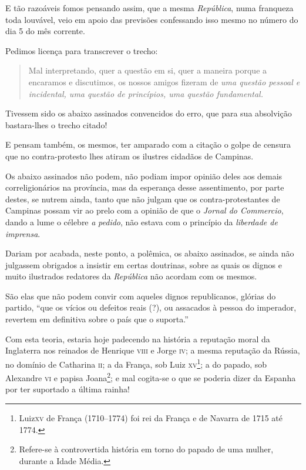 E tão razoáveis fomos pensando assim, que a mesma \emph{República}, numa
franqueza toda louvável, veio em apoio das previsões confessando isso
mesmo no número do dia 5 do mês corrente.

Pedimos licença para transcrever o trecho:

\begin{quote}
Mal interpretando, quer a questão em si, quer a maneira porque a
encaramos e discutimos, os nossos amigos fizeram de \emph{uma questão
pessoal e incidental, uma questão de princípios, uma questão
fundamental.}
\end{quote}

Tivessem sido os abaixo assinados convencidos do erro, que para sua
absolvição bastara-lhes o trecho citado!

E pensam também, os mesmos, ter amparado com a citação o golpe de
censura que no contra-protesto lhes atiram os ilustres cidadãos de
Campinas.

Os abaixo assinados não podem, não podiam impor opinião deles aos demais
correligionários na província, mas da esperança desse assentimento, por
parte destes, se nutrem ainda, tanto que não julgam que os
contra-protestantes de Campinas possam vir ao prelo com a opinião de que
o \emph{Jornal do Commercio}, dando a lume o célebre \emph{a}
\emph{pedido}, não estava com o princípio da \emph{liberdade de
imprensa}.

Dariam por acabada, neste ponto, a polêmica, os abaixo assinados, se
ainda não julgassem obrigados a insistir em certas doutrinas, sobre as
quais os dignos e muito ilustrados redatores da \emph{República} não
acordam com os mesmos.

São elas que não podem convir com aqueles dignos republicanos, glórias
do partido, ``que os vícios ou defeitos reais (?), ou assacados à pessoa
do imperador, revertem em definitiva sobre o país que o suporta.''

Com esta teoria, estaria hoje padecendo na história a reputação moral da
Inglaterra nos reinados de Henrique \textsc{viii} e Jorge \textsc{iv}; a mesma reputação
da Rússia, no domínio de Catharina \textsc{ii}; a da França, sob Luiz
\textsc{xv}\footnote{ Luiz\textsc{xv} de França (1710--1774) foi rei da França e de
  Navarra de 1715 até 1774.}; a do papado, sob Alexandre \textsc{vi} e papisa
Joana\footnote{ Refere-se à controvertida história em torno do papado
  de uma mulher, durante a Idade Média.}; e mal cogita-se o que se
poderia dizer da Espanha por ter suportado a última rainha!

